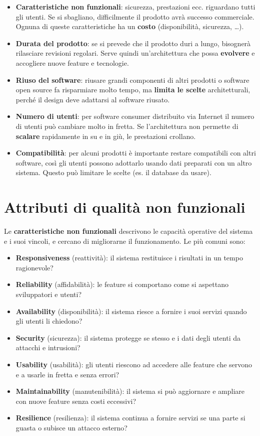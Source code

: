 \begin{itemize}
\tightlist
\item
  \textbf{Caratteristiche non funzionali}: sicurezza, prestazioni ecc.
  riguardano tutti gli utenti. Se si sbagliano, difficilmente il
  prodotto avrà successo commerciale. Ognuna di queste caratteristiche
  ha un \textbf{costo} (disponibilità, sicurezza, \ldots).
\item
  \textbf{Durata del prodotto}: se si prevede che il prodotto duri a
  lungo, bisognerà rilasciare revisioni regolari. Serve quindi
  un'architettura che possa \textbf{evolvere} e accogliere nuove feature
  e tecnologie.
\item
  \textbf{Riuso del software}: riusare grandi componenti di altri
  prodotti o software open source fa risparmiare molto tempo, ma
  \textbf{limita le scelte} architetturali, perché il design deve
  adattarsi al software riusato.
\item
  \textbf{Numero di utenti}: per software consumer distribuito via
  Internet il numero di utenti può cambiare molto in fretta. Se
  l'architettura non permette di \textbf{scalare} rapidamente in su e in
  giù, le prestazioni crollano.
\item
  \textbf{Compatibilità}: per alcuni prodotti è importante restare
  compatibili con altri software, così gli utenti possono adottarlo
  usando dati preparati con un altro sistema. Questo può limitare le
  scelte (es. il database da usare).
\end{itemize}

\section{Attributi di qualità non
funzionali}\label{attributi-di-qualituxe0-non-funzionali}

Le \textbf{caratteristiche non funzionali} descrivono le capacità
operative del sistema e i suoi vincoli, e cercano di migliorarne il
funzionamento. Le più comuni sono:

\begin{itemize}
\tightlist
\item
  \textbf{Responsiveness} (reattività): il sistema restituisce i
  risultati in un tempo ragionevole?
\item
  \textbf{Reliability} (affidabilità): le feature si comportano come si
  aspettano sviluppatori e utenti?
\item
  \textbf{Availability} (disponibilità): il sistema riesce a fornire i
  suoi servizi quando gli utenti li chiedono?
\item
  \textbf{Security} (sicurezza): il sistema protegge se stesso e i dati
  degli utenti da attacchi e intrusioni?
\item
  \textbf{Usability} (usabilità): gli utenti riescono ad accedere alle
  feature che servono e a usarle in fretta e senza errori?
\item
  \textbf{Maintainability} (manutenibilità): il sistema si può
  aggiornare e ampliare con nuove feature senza costi eccessivi?
\item
  \textbf{Resilience} (resilienza): il sistema continua a fornire
  servizi se una parte si guasta o subisce un attacco esterno?
\end{itemize}

